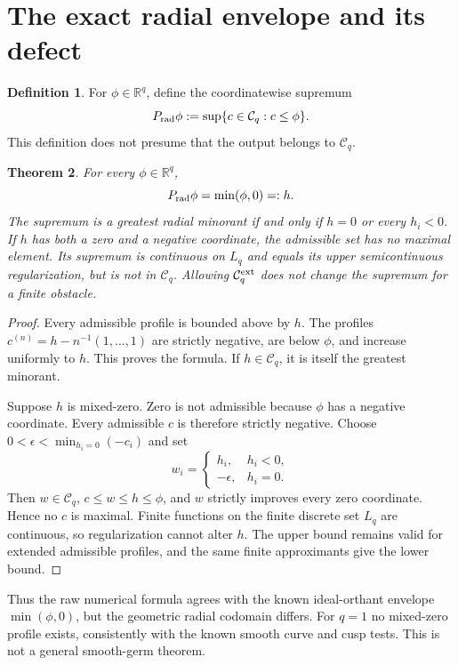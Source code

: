 \documentclass[11pt]{article}
\newtheorem{theorem}{Theorem}
\theoremstyle{definition}
\newtheorem{definition}[theorem]{Definition}
\newcommand{\Cq}{\mathcal C_q}
\newcommand{\Prad}{P_{\rm rad}}
\begin{document}
\section{The exact radial envelope and its defect}
\begin{definition}
For $\phi\in\mathbb R^q$, define the coordinatewise supremum
\[
 \Prad\phi:=\sup\{c\in\Cq:c\leq\phi\}.
\]
This definition does not presume that the output belongs to $\Cq$.
\end{definition}

\begin{theorem}\label{thm:envelope}
For every $\phi\in\mathbb R^q$,
\[
 \Prad\phi=\min(\phi,0)=:h.
\]
The supremum is a greatest radial minorant if and only if $h=0$ or
every $h_i<0$. If $h$ has both a zero and a negative coordinate, the
admissible set has no maximal element. Its supremum is continuous on
$L_q$ and equals its upper semicontinuous regularization, but is not in
$\Cq$. Allowing $\Cq^{\rm ext}$ does not change the supremum for a
finite obstacle.
\end{theorem}
\begin{proof}
Every admissible profile is bounded above by $h$. The profiles
$c^{(n)}=h-n^{-1}(1,\ldots,1)$ are strictly negative, are below
$\phi$, and increase uniformly to $h$. This proves the formula.
If $h\in\Cq$, it is itself the greatest minorant.

Suppose $h$ is mixed-zero. Zero is not admissible because $\phi$ has a
negative coordinate. Every admissible $c$ is therefore strictly negative.
Choose $0<\epsilon<\min_{h_i=0}(-c_i)$ and set
\[
 w_i=\begin{cases}h_i,&h_i<0,\\-\epsilon,&h_i=0.\end{cases}
\]
Then $w\in\Cq$, $c\leq w\leq h\leq\phi$, and $w$ strictly improves
every zero coordinate. Hence no $c$ is maximal. Finite functions on
the finite discrete set $L_q$ are continuous, so regularization cannot
alter $h$. The upper bound remains valid for extended admissible
profiles, and the same finite approximants give the lower bound.
\end{proof}

Thus the raw numerical formula agrees with the known ideal-orthant
envelope $\min(\phi,0)$, but the geometric radial codomain differs.
For $q=1$ no mixed-zero profile exists, consistently with the known
smooth curve and cusp tests. This is not a general smooth-germ theorem.
\end{document}
